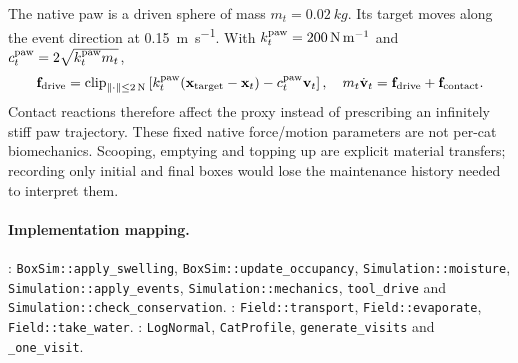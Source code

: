 The native paw is a driven sphere of mass $m_t=\SI{0.02}{kg}$. Its target moves
along the event direction at \SI{0.15}{m.s^{-1}}. With
$k_t^{\rm paw}=\SI{200}{N.m^{-1}}$ and
$c_t^{\rm paw}=2\sqrt{k_t^{\rm paw}m_t}$,
\begin{equation}
 \mathbf{f}_{\rm drive}=\operatorname{clip}_{\|\cdot\|\leq\SI{2}{N}}
 \left[k_t^{\rm paw}(\mathbf{x}_{\rm target}-\mathbf{x}_t)
          -c_t^{\rm paw}\mathbf{v}_t\right],\quad
 m_t\dot{\mathbf{v}}_t=\mathbf{f}_{\rm drive}+\mathbf{f}_{\rm contact}.
\end{equation}
Contact reactions therefore affect the proxy instead of prescribing an
infinitely stiff paw trajectory. These fixed native force/motion parameters
are not per-cat biomechanics. Scooping, emptying and topping up are explicit
material transfers; recording only initial and final boxes would lose the
maintenance history needed to interpret them.

\paragraph{Implementation mapping.}
: \nolinkurl{BoxSim::apply_swelling},
\nolinkurl{BoxSim::update_occupancy}, \nolinkurl{Simulation::moisture},
\nolinkurl{Simulation::apply_events}, \nolinkurl{Simulation::mechanics},
\nolinkurl{tool_drive} and \nolinkurl{Simulation::check_conservation}.
: \nolinkurl{Field::transport},
\nolinkurl{Field::evaporate}, \nolinkurl{Field::take_water}.
: \nolinkurl{LogNormal},
\nolinkurl{CatProfile}, \nolinkurl{generate_visits} and \nolinkurl{_one_visit}.
